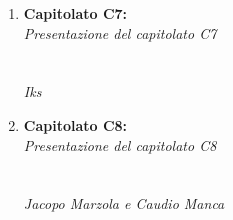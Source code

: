 \documentclass[StudioDiFattibilità.tex]{subfiles}
\begin{document}
\begin{enumerate}
	\item \textbf{Capitolato C7:}\\
		\textit{Presentazione del capitolato C7}\\
		\\\\
		\textit{Iks} 

	\item \textbf{Capitolato C8:}\\
		\textit{Presentazione del capitolato C8}\\
		\\\\
		\textit{Jacopo Marzola e Caudio Manca}


\end{enumerate}
\end{document}
